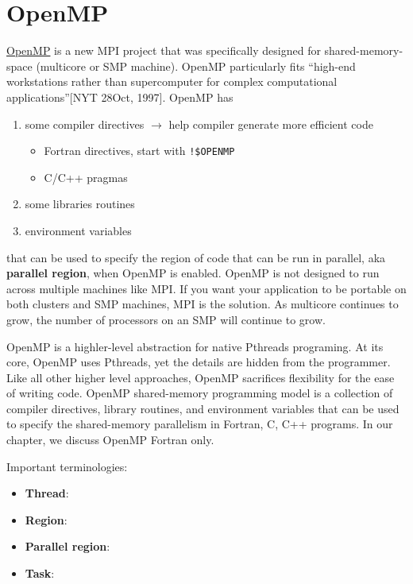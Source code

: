 
\chapter{OpenMP}
\label{chap:openmp}


\href{http://www.open-mpi.org/}{OpenMP} is a new MPI project that was
specifically designed for shared-memory-space (multicore or SMP
machine). OpenMP particularly fits ``high-end workstations rather than
supercomputer for complex computational applications''[NYT 28Oct,
1997]. OpenMP has
\begin{enumerate}
\item some compiler directives $\rightarrow$ help compiler generate
  more efficient code
  \begin{itemize}
  \item Fortran directives, start with \verb.!$OPENMP.
  \item C/C++ pragmas 
  \end{itemize}

\item some libraries routines
\item environment variables
\end{enumerate}
that can be used to specify the region of code that can be run in
parallel, aka {\bf parallel region}, when OpenMP is enabled.  OpenMP
is not designed to run across multiple machines like MPI. If you want
your application to be portable on both clusters and SMP machines, MPI
is the solution.  As multicore continues to grow, the number of
processors on an SMP will continue to grow.

OpenMP is a highler-level abstraction for native Pthreads
programing. At its core, OpenMP uses Pthreads, yet the details are
hidden from the programmer. Like all other higher level approaches,
OpenMP sacrifices flexibility for the ease of writing code.  OpenMP
shared-memory programming model is a collection of compiler
directives, library routines, and environment variables that can be
used to specify the shared-memory parallelism in Fortran, C, C++
programs. In our chapter, we discuss OpenMP Fortran only.


Important terminologies:
\begin{itemize}
\item {\bf Thread}:

\item {\bf Region}:

\item {\bf Parallel region}:

\item {\bf Task}: 
\end{itemize}

